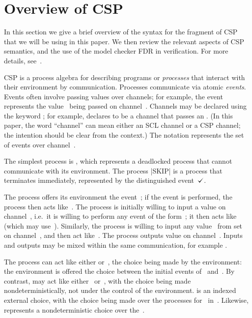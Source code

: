 \section{Overview of CSP} 
\label{sec:csp}

In this section we give a brief overview of the syntax for the fragment of CSP
that we will be using in this paper.  We then review the relevant aspects of
CSP semantics, and the use of the model checker FDR in verification.  For more
details, see~\cite{awr:UCS}.

CSP is a process algebra for describing programs or {\em processes}\/ that
interact with their environment by communication.  Processes communicate via
atomic \emph{events}.  Events often involve passing values over channels; for
example, the event  represents the value~ being passed on
channel~.  Channels may be declared using the keyword ;
for example,  declares  to be a channel that
passes an .  (In this paper, the word ``channel'' can mean either an
SCL channel or a CSP channel; the intention should be clear from the context.)
The notation  represents the set of events over
channel~.

The simplest process is , which represents a deadlocked process that
cannot communicate with its environment.  The process |SKIP| is a process that
terminates immediately, represented by the distinguished event~$\tick$. 

The process  offers its environment the event~; if the
event is performed, the process then acts like~.  The process
  is initially willing to input a value  on
channel~, i.e.~it is willing to perform any event of the
form~; it then acts like~ (which may use~).
Similarly, the process  is willing to input any
value~ from set~ on channel~, and then act
like~. 
The process  outputs value  on channel~.
Inputs and outputs may be mixed within the same communication, for example
.

The process  can act like either  or~, the choice
being made by the environment: the environment is offered the choice between
the initial events of~ and~.  By contrast,  may
act like either~ or~, with the choice being made
nondeterministically, not under the control of the environment.   is an indexed external choice, with the choice being made over
the processes  for~ in~.  Likewise, 
 represents a nondeterministic choice over the~.

